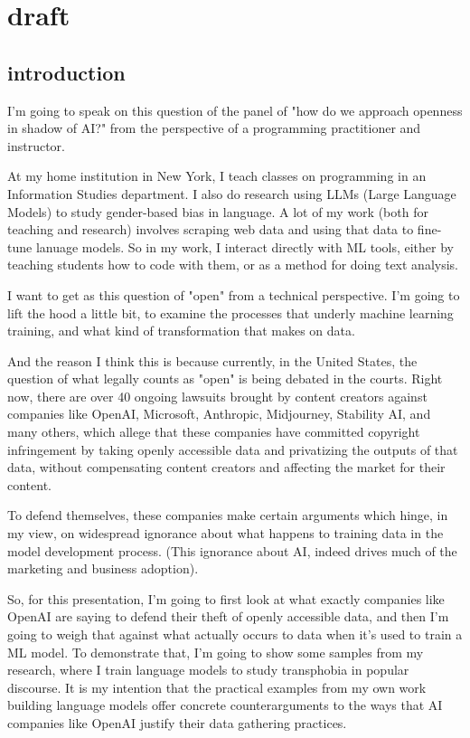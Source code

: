 \documentclass[11pt]{article}
\author{fcalado}
\date{\today}
\title{}
\begin{document}
\tableofcontents

\section{draft}
\label{sec:org3731ebf}

\subsection{introduction}
\label{sec:org10fa022}
I'm going to speak on this question of the panel of "how do we
approach openness in shadow of AI?" from the perspective of a
programming practitioner and instructor.

At my home institution in New York, I teach classes on programming in
an Information Studies department. I also do research using LLMs
(Large Language Models) to study gender-based bias in language. A lot
of my work (both for teaching and research) involves scraping web data
and using that data to fine-tune lanuage models. So in my work, I
interact directly with ML tools, either by teaching students how to
code with them, or as a method for doing text analysis.

I want to get as this question of "open" from a technical perspective.
I'm going to lift the hood a little bit, to examine the processes that
underly machine learning training, and what kind of transformation
that makes on data.

And the reason I think this is because currently, in the United
States, the question of what legally counts as "open" is being debated
in the courts. Right now, there are over 40 ongoing lawsuits brought
by content creators against companies like OpenAI, Microsoft,
Anthropic, Midjourney, Stability AI, and many others, which allege
that these companies have committed copyright infringement by taking
openly accessible data and privatizing the outputs of that data,
without compensating content creators and affecting the market for
their content.

To defend themselves, these companies make certain arguments which
hinge, in my view, on widespread ignorance about what happens to
training data in the model development process. (This ignorance about
AI, indeed drives much of the marketing and business adoption).

So, for this presentation, I'm going to first look at what exactly
companies like OpenAI are saying to defend their theft of openly
accessible data, and then I'm going to weigh that against what
actually occurs to data when it's used to train a ML model. To
demonstrate that, I'm going to show some samples from my research,
where I train language models to study transphobia in popular
discourse. It is my intention that the practical examples from my own
work building language models offer concrete counterarguments to the
ways that AI companies like OpenAI justify their data gathering
practices. 
\end{document}
